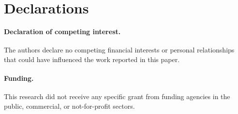 \section*{Declarations}

\paragraph{Declaration of competing interest.} The authors declare no
competing financial interests or personal relationships that could have
influenced the work reported in this paper.

\paragraph{Funding.} This research did not receive any specific grant from funding
agencies in the public, commercial, or not-for-profit sectors.

